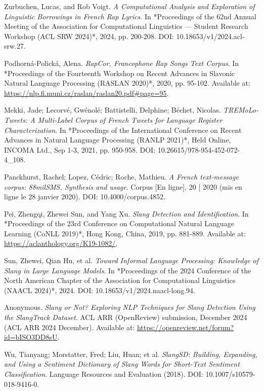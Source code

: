 \documentclass[12pt]{article}
\begin{document}
\begin{thebibliography}{9}
Zurbuchen, Lucas, and Rob Voigt.  
\textit{A Computational Analysis and Exploration of Linguistic Borrowings in French Rap Lyrics}.  
In *Proceedings of the 62nd Annual Meeting of the Association for Computational Linguistics — Student Research Workshop (ACL SRW 2024)*, 2024, pp. 200-208.  
DOI: 10.18653/v1/2024.acl-srw.27.  

Podhorná-Polická, Alena.  
\textit{RapCor, Francophone Rap Songs Text Corpus}.  
In *Proceedings of the Fourteenth Workshop on Recent Advances in Slavonic Natural Language Processing (RASLAN 2020)*, 2020, pp. 95-102.  
Available at: \url{https://nlp.fi.muni.cz/raslan/raslan20.pdf#page=95}.  %

Mekki, Jade; Lecorvé, Gwénolé; Battistelli, Delphine; Béchet, Nicolas.  
\textit{TREMoLo-Tweets: A Multi-Label Corpus of French Tweets for Language Register Characterization}.  
In *Proceedings of the International Conference on Recent Advances in Natural Language Processing (RANLP 2021)*, Held Online, INCOMA Ltd., Sep 1-3, 2021, pp. 950-958.  
DOI: 10.26615/978-954-452-072-4\_108.  

Panckhurst, Rachel; Lopez, Cédric; Roche, Mathieu.  
\textit{A French text-message corpus: 88milSMS. Synthesis and usage}.  
Corpus [En ligne], 20 | 2020 (mis en ligne le 28 janvier 2020).  
DOI: 10.4000/corpus.4852.  

Pei, Zhengqi, Zhewei Sun, and Yang Xu.  
\textit{Slang Detection and Identification}.  
In *Proceedings of the 23rd Conference on Computational Natural Language Learning (CoNLL 2019)*, Hong Kong, China, 2019, pp. 881-889.  
Available at: \url{https://aclanthology.org/K19-1082/}.  %

Sun, Zhewei, Qian Hu, et al.  
\textit{Toward Informal Language Processing: Knowledge of Slang in Large Language Models}.  
In *Proceedings of the 2024 Conference of the North American Chapter of the Association for Computational Linguistics (NAACL 2024)*, 2024.  
DOI: 10.18653/v1/2024.naacl-long.94.  

Anonymous.  
\textit{Slang or Not? Exploring NLP Techniques for Slang Detection Using the SlangTrack Dataset}.  
ACL ARR (OpenReview) submission, December 2024 (ACL ARR 2024 December).  
Available at: \url{https://openreview.net/forum?id=bISO3DD8sU}.

Wu, Tianyang; Morstatter, Fred; Liu, Huan; et al.  
\textit{SlangSD: Building, Expanding, and Using a Sentiment Dictionary of Slang Words for Short-Text Sentiment Classification}.  
Language Resources and Evaluation (2018).  
DOI: 10.1007/s10579-018-9416-0.  


\end{thebibliography}
\end{document}
